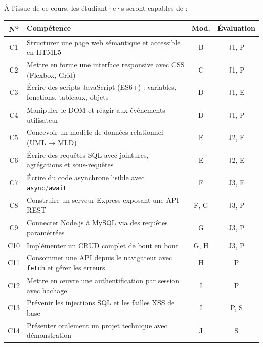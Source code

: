\documentclass[a4paper,11pt]{article}
\begin{document}
À l'issue de ce cours, les étudiant·e·s seront capables de :

\begin{center}
\begin{tabularx}{\linewidth}{cXcc}
  \toprule
  \rowcolor{accentBlue}
  \color{white}\textbf{N\textsuperscript{o}} &
  \color{white}\textbf{Compétence} &
  \color{white}\textbf{Mod.} &
  \color{white}\textbf{Évaluation} \\
  \midrule
  \rowcolor{cfptGrey}
  C1 & Structurer une page web sémantique et accessible en HTML5 & B & J1, P \\
  C2 & Mettre en forme une interface responsive avec CSS (Flexbox, Grid) & C & J1, P \\
  \rowcolor{cfptGrey}
  C3 & Écrire des scripts JavaScript (ES6+) : variables, fonctions, tableaux, objets & D & J1, E \\
  C4 & Manipuler le DOM et réagir aux événements utilisateur & D & J1, P \\
  \rowcolor{cfptGrey}
  C5 & Concevoir un modèle de données relationnel (UML → MLD) & E & J2, E \\
  C6 & Écrire des requêtes SQL avec jointures, agrégations et sous-requêtes & E & J2, E \\
  \rowcolor{cfptGrey}
  C7 & Écrire du code asynchrone lisible avec \texttt{async}/\texttt{await} & F & J3, E \\
  C8 & Construire un serveur Express exposant une API REST & F, G & J3, P \\
  \rowcolor{cfptGrey}
  C9 & Connecter Node.js à MySQL via des requêtes paramétrées & G & J3, P \\
  C10 & Implémenter un CRUD complet de bout en bout & G, H & J3, P \\
  \rowcolor{cfptGrey}
  C11 & Consommer une API depuis le navigateur avec \texttt{fetch} et gérer les erreurs & H & P \\
  C12 & Mettre en œuvre une authentification par session avec hachage & I & P \\
  \rowcolor{cfptGrey}
  C13 & Prévenir les injections SQL et les failles XSS de base & I & P, S \\
  C14 & Présenter oralement un projet technique avec démonstration & J & S \\
  \bottomrule
\end{tabularx}
\end{center}

\medskip
{}
\end{document}
